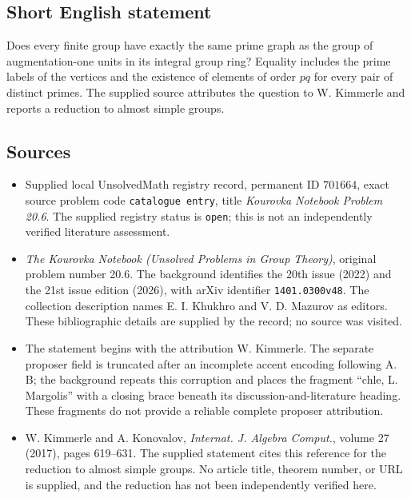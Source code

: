 \documentclass[11pt]{article}
\begin{document}
\subsection{Short English statement}
Does every finite group have exactly the same prime graph as the group of augmentation-one units in its integral group ring? Equality includes the prime labels of the vertices and the existence of elements of order \(pq\) for every pair of distinct primes. The supplied source attributes the question to W. Kimmerle and reports a reduction to almost simple groups.
\subsection{Sources}
\begin{itemize}
\item Supplied local UnsolvedMath registry record, permanent ID \(701664\), exact source problem code \texttt{catalogue entry}, title \emph{Kourovka Notebook Problem 20.6}. The supplied registry status is \texttt{open}; this is not an independently verified literature assessment.
\item \emph{The Kourovka Notebook (Unsolved Problems in Group Theory)}, original problem number 20.6. The background identifies the 20th issue (2022) and the 21st issue edition (2026), with arXiv identifier \texttt{1401.0300v48}. The collection description names E. I. Khukhro and V. D. Mazurov as editors. These bibliographic details are supplied by the record; no source was visited.
\item The statement begins with the attribution W. Kimmerle. The separate proposer field is truncated after an incomplete accent encoding following A. B; the background repeats this corruption and places the fragment ``chle, L. Margolis'' with a closing brace beneath its discussion-and-literature heading. These fragments do not provide a reliable complete proposer attribution.
\item W. Kimmerle and A. Konovalov, \emph{Internat. J. Algebra Comput.}, volume 27 (2017), pages 619--631. The supplied statement cites this reference for the reduction to almost simple groups. No article title, theorem number, or URL is supplied, and the reduction has not been independently verified here.
\end{itemize}
\end{document}
